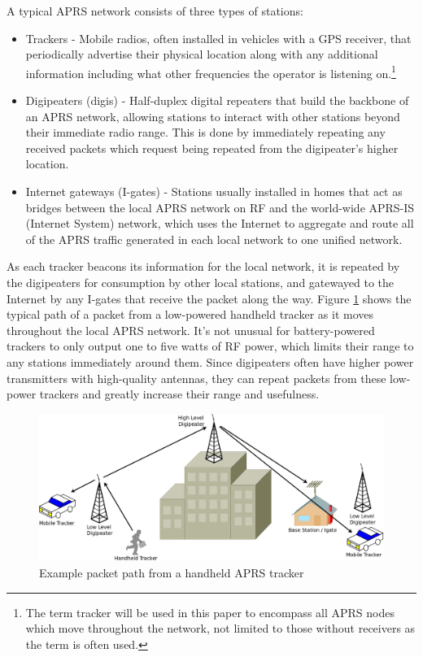 A typical APRS network consists of three types of stations:
\begin{itemize}
	\item Trackers - Mobile radios, often installed in vehicles with
		a GPS receiver, that periodically advertise their physical location
		along with any additional information including what other frequencies
		the operator is listening on.\footnote{The term tracker will
			be used in this paper to encompass all APRS nodes which move
			throughout the network, not limited to those without receivers as
		the term is often used.}
	\item Digipeaters (digis) - Half-duplex digital repeaters that build the
		backbone of an APRS network, allowing stations to interact with other
		stations beyond their immediate radio range. This is done by immediately
		repeating any received packets which request being repeated from the
		digipeater's higher location. 
	\item Internet gateways (I-gates) - Stations usually installed in homes
		that act as bridges between the local APRS network on RF and the
		world-wide APRS-IS (Internet System) network, which uses the Internet
		to aggregate and route all of the APRS traffic generated in each
		local network to one unified network.
\end{itemize} 

As each tracker beacons its information for the local network, it is repeated
by the digipeaters for consumption by other local stations, and gatewayed
to the Internet by any I-gates that receive the packet along the way. 
Figure \ref{fig:demonetwork}
shows the typical path of a packet from a low-powered handheld tracker as it moves
throughout the local APRS network. It's not unusual for battery-powered trackers to
only output one to five watts of RF power, which limits their range to any stations
immediately around them. 
Since digipeaters often have higher power transmitters with 
high-quality antennas, they can repeat packets from these low-power trackers 
and greatly increase their range and usefulness.

\begin{figure}
	\centering
	\includegraphics[width=1.0\textwidth]{src/dia/demonetwork}
	\caption{Example packet path from a handheld APRS tracker}
	\label{fig:demonetwork}
\end{figure}

